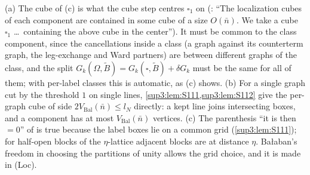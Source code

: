 \begin{remark}\label{sup3:rem:S11}
(a) The cube of (c) is what the cube step centres $\square_1$ on (\cite[p.~433]{Ba3}: ``The localization cubes of each component are contained in some cube of a size $O(\bar n)$. We take a cube $\square_1$ \dots\ containing the above cube in the center''). It must be common to the class component, since the cancellations inside a class (a graph against its counterterm graph, the leg-exchange and Ward partners) are between different graphs of the class, and the split $G_k(\Omega,\tilde B)=G_k(\square,\tilde B)+\delta G_k$ must be the same for all of them; with per-label classes this is automatic, as (c) shows. (b) For a single graph cut by the threshold $1$ on single lines, \cref{sup3:lem:S111,sup3:lem:S112} give the per-graph cube of side $2V_{\mathrm{Bal}}(\bar n)\le l_N$ directly: a kept line joins intersecting boxes, and a component has at most $V_{\mathrm{Bal}}(\bar n)$ vertices. (c) The parenthesis ``it is then $=0$'' of \cite[p.~432]{Ba3} is true because the label boxes lie on a common grid (\cref{sup3:lem:S111}); for half-open blocks of the $\eta$-lattice adjacent blocks are at distance $\eta$. Ba{\l}aban's freedom in choosing the partitions of unity allows the grid choice, and it is made in (Loc).
\end{remark}
